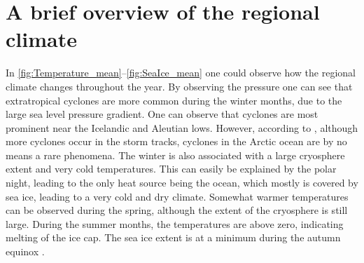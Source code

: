 \section{A brief overview of the regional climate}

In \autoref{fig:Temperature_mean}--\ref{fig:SeaIce_mean} one could observe how the regional climate changes throughout the year. By observing the pressure one can see that extratropical cyclones are more common during the winter months, due to the large sea level pressure gradient. One can observe that cyclones are most prominent near the Icelandic and Aleutian lows. However, according to \citet{serreze2014}, although more cyclones occur in the storm tracks, cyclones in the Arctic ocean are by no means a rare phenomena. The winter is also associated with a large cryosphere extent and very cold temperatures. This can easily be explained by the polar night, leading to the only heat source being the ocean, which mostly is covered by sea ice, leading to a very cold and dry climate. Somewhat warmer temperatures can be observed during the spring, although the extent of the cryosphere is still large. During the summer months, the temperatures are above zero, indicating melting of the ice cap. The sea ice extent is at a minimum during the autumn equinox \citep{serreze2014}.  

